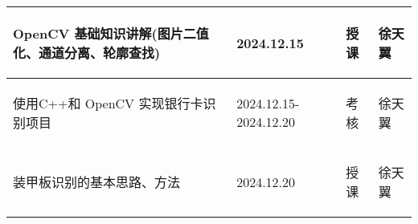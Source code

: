 \begin{longtable}{ p{6cm} | p{3cm} | p{1.5cm} | p{4.3cm} |}
    \hline

        \begin{center}
            OpenCV 基础知识讲解(图片二值化、通道分离、轮廓查找)
        \end{center}&
        \begin{center}
            2024.12.15
        \end{center}&
        \begin{center}
            授课
        \end{center}&
        \begin{center}
            徐天翼
        \end{center}\\
        
    \hline
    
        \begin{center}
            使用C++和 OpenCV 实现银行卡识别项目
        \end{center} &
        \begin{center}
            2024.12.15-2024.12.20
        \end{center} &
        \begin{center}
            考核
        \end{center} &
        \begin{center}
            徐天翼
        \end{center} \\

    \hline
    
        \begin{center}
            装甲板识别的基本思路、方法
        \end{center} &
        \begin{center}
            2024.12.20
        \end{center} &
        \begin{center}
            授课
        \end{center} &
        \begin{center}
            徐天翼
        \end{center} \\

    \hline


\end{longtable}
